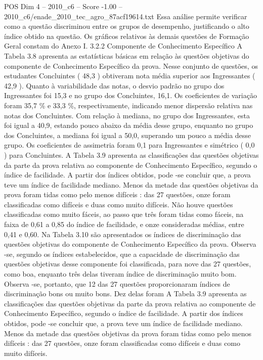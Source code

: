 \begin{textsample}{POS Dim 4 – 2010\_c6 – Score -1.00 – 2010\_c6/enade\_2010\_tec\_agro\_87acf19614.txt}
Essa análise permite verificar como a questão discriminou entre os grupos de desempenho, justificando o alto índice obtido na questão.
Os gráficos relativos às demais questões de Formação Geral constam do Anexo I. 3.2.2 Componente de Conhecimento Específico A Tabela 3.8 apresenta as estatísticas básicas em relação às questões objetivas do componente de Conhecimento Específico da prova.
Nesse conjunto de questões, os estudantes Concluintes ( 48,3 ) obtiveram nota média superior aos Ingressantes ( 42,9 ).
Quanto à variabilidade das notas, o desvio padrão no grupo dos Ingressantes foi 15,3 e no grupo dos Concluintes, 16,1.
Os coeficientes de variação foram 35,7 \% e 33,3 \%, respectivamente, indicando menor dispersão relativa nas notas dos Concluintes.
Com relação à mediana, no grupo dos Ingressantes, esta foi igual a 40,9, estando pouco abaixo da média desse grupo, enquanto no grupo dos Concluintes, a mediana foi igual a 50,0, superando um pouco a média desse grupo.
Os coeficientes de assimetria foram 0,1 para Ingressantes e simétrico ( 0,0 ) para Concluintes.
A Tabela 3.9 apresenta as classificações das questões objetivas da parte da prova relativa ao componente de Conhecimento Específico, segundo o índice de facilidade.
A partir dos índices obtidos, pode -se concluir que, a prova teve um índice de facilidade mediano.
Menos da metade das questões objetivas da prova foram tidas como pelo menos difíceis : das 27 questões, onze foram classificadas como difíceis e duas como muito difíceis.
Não houve questões classificadas como muito fáceis, ao passo que três foram tidas como fáceis, na faixa de 0,61 a 0,85 do índice de facilidade, e onze consideradas médias, entre 0,41 e 0,60.
Na Tabela 3.10 são apresentados os índices de discriminação das questões objetivas do componente de Conhecimento Específico da prova.
Observa -se, segundo os índices estabelecidos, que a capacidade de discriminação das questões objetivas desse componente foi classificada, para nove das 27 questões, como boa, enquanto três delas tiveram índice de discriminação muito bom.
Observa -se, portanto, que 12 das 27 questões proporcionaram índices de discriminação bons ou muito bons.
Dez delas foram A Tabela 3.9 apresenta as classificações das questões objetivas da parte da prova relativa ao componente de Conhecimento Específico, segundo o índice de facilidade.
A partir dos índices obtidos, pode -se concluir que, a prova teve um índice de facilidade mediano.
Menos da metade das questões objetivas da prova foram tidas como pelo menos difíceis : das 27 questões, onze foram classificadas como difíceis e duas como muito difíceis.

\end{textsample}
